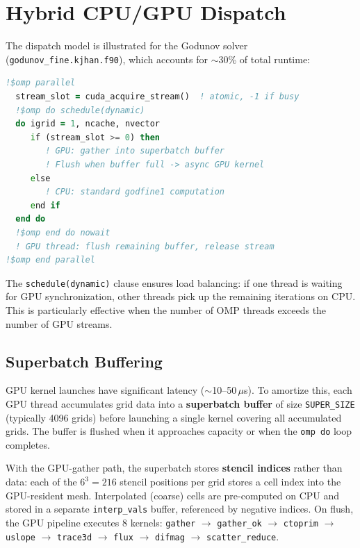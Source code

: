 \documentclass[11pt,fleqn]{book}
\begin{document}
\section{Hybrid CPU/GPU Dispatch}

The dispatch model is illustrated for the Godunov solver (\texttt{godunov\_fine.kjhan.f90}), which accounts for $\sim$30\% of total runtime:

\begin{lstlisting}[language=Fortran,basicstyle=\small\ttfamily,frame=single,caption={Dynamic hybrid dispatch pattern},label=lst:hybrid]
!$omp parallel
  stream_slot = cuda_acquire_stream()  ! atomic, -1 if busy
  !$omp do schedule(dynamic)
  do igrid = 1, ncache, nvector
     if (stream_slot >= 0) then
        ! GPU: gather into superbatch buffer
        ! Flush when buffer full -> async GPU kernel
     else
        ! CPU: standard godfine1 computation
     end if
  end do
  !$omp end do nowait
  ! GPU thread: flush remaining buffer, release stream
!$omp end parallel
\end{lstlisting}

The \texttt{schedule(dynamic)} clause ensures load balancing: if one thread is waiting for GPU synchronization, other threads pick up the remaining iterations on CPU.  This is particularly effective when the number of OMP threads exceeds the number of GPU streams.

\subsection{Superbatch Buffering}

GPU kernel launches have significant latency ($\sim$10--50\,$\mu$s).  To amortize this, each GPU thread accumulates grid data into a \textbf{superbatch buffer} of size \texttt{SUPER\_SIZE} (typically 4096 grids) before launching a single kernel covering all accumulated grids.  The buffer is flushed when it approaches capacity or when the \texttt{omp do} loop completes.

With the GPU-gather path, the superbatch stores \textbf{stencil indices} rather than data: each of the $6^3 = 216$ stencil positions per grid stores a cell index into the GPU-resident mesh.  Interpolated (coarse) cells are pre-computed on CPU and stored in a separate \texttt{interp\_vals} buffer, referenced by negative indices.  On flush, the GPU pipeline executes 8 kernels: \texttt{gather} $\to$ \texttt{gather\_ok} $\to$ \texttt{ctoprim} $\to$ \texttt{uslope} $\to$ \texttt{trace3d} $\to$ \texttt{flux} $\to$ \texttt{difmag} $\to$ \texttt{scatter\_reduce}.
\end{document}
